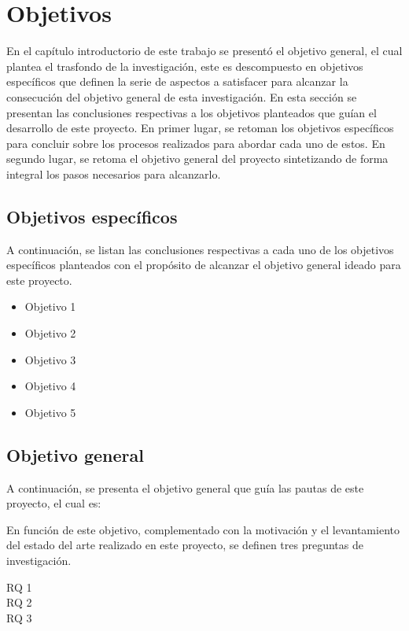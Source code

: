 \section{Objetivos}
En el capítulo introductorio de este trabajo se presentó el objetivo general, el cual plantea el trasfondo de la investigación, este es descompuesto en objetivos específicos que definen la serie de aspectos a satisfacer para alcanzar la consecución del objetivo general de esta investigación. En esta sección se presentan las conclusiones respectivas a los objetivos planteados que guían el desarrollo de este proyecto. En primer lugar, se retoman los objetivos específicos para concluir sobre los procesos realizados para abordar cada uno de estos. En segundo lugar, se retoma el objetivo general del proyecto sintetizando de forma integral los pasos necesarios para alcanzarlo.

\subsection{Objetivos específicos}
A continuación, se listan las conclusiones respectivas a cada uno de los objetivos específicos planteados con el propósito de alcanzar el objetivo general ideado para este proyecto. 

\begin{itemize}
 \item Objetivo 1
 \item Objetivo 2
 \item Objetivo 3
 \item Objetivo 4
 \item Objetivo 5
\end{itemize}

\subsection{Objetivo general}
A continuación, se presenta el objetivo general que guía las pautas de este proyecto, el cual es:

En función de este objetivo, complementado con la motivación y el levantamiento del estado del arte realizado en este proyecto, se definen tres preguntas de investigación.

\begin{description}
	\item [RQ 1]
	\item [RQ 2]
	\item [RQ 3]
\end{description}